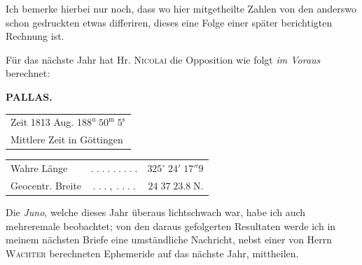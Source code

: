 \par\indent Ich bemerke hierbei nur noch, dass wo hier mitgetheilte Zahlen von den anderswo schon gedruckten
etwas differiren, dieses eine Folge einer später berichtigten Rechnung ist.

\par\indent Für das nächste Jahr hat Hr. \textsc{Nicolai} die Opposition wie folgt \emph{im Voraus} berechnet:
\clearpage
\thispagestyle{empty}
\noindent{}%
%
\parbox[t]{\dimexpr\linewidth-24mm\relax}{\centering\footnotesize\bfseries PALLAS.\par}%
\makebox[12mm][r]{}\par\nobreak\medskip
\begin{center}\fontsize{10}{12}\selectfont\setlength{\tabcolsep}{0pt}\renewcommand{\arraystretch}{1.15}\begin{tabular}{l}
Zeit 1813 Aug. 18\quad $8^{\mathrm u}\;50^{\mathrm m}\;5^{\mathrm s}$\\Mittlere Zeit in Göttingen
\end{tabular}\end{center}
\begin{center}\fontsize{10}{12}\selectfont\setlength{\tabcolsep}{2pt}\renewcommand{\arraystretch}{1.15}\begin{tabular}{lcr}
Wahre Länge & $.\;.\;.\;.\;.\;.\;.\;.\;.$ & $325^\circ\;24'\;17''9$\\
Geocentr. Breite & $.\;.\;.\;,\;.\;.\;.\;.$ & $24\;37\;23.8\;\mathrm{N}.$\\
\end{tabular}\end{center}

\par\indent Die \emph{Juno}, welche dieses Jahr überaus lichtschwach war, habe ich auch mehreremale beobachtet;
von den daraus gefolgerten Resultaten werde ich in meinem nächsten Briefe eine umständliche Nachricht,
nebst einer von Herrn \textsc{Wachter} berechneten Ephemeride auf das nächste Jahr, mittheilen.
